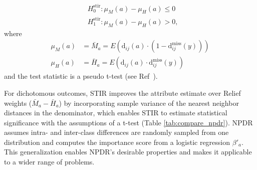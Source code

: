 \documentclass[10pt]{article}
\begin{document}

\begin{equation}
\begin{aligned}
    & H^{\text{stir}}_0: \mu_M(a) - \mu_H(a) \le 0 \\
    & H^{\text{stir}}_1: \mu_M(a) - \mu_H(a) > 0,
\end{aligned}
\end{equation}  
where
\begin{equation}
\begin{aligned}
    \mu_M(a) & = \bar{M}_a = E \left( \text{d}_{ij}(a) \cdot \left( 1-\text{d}^{\text{miss}}_{ij}(y) \right) \right) \\
    \mu_H(a) & = \bar{H}_a = E \left( \text{d}_{ij}(a) \cdot        \text{d}^{\text{miss}}_{ij}(y)           \right)
\end{aligned}
\end{equation}  
and the test statistic is a pseudo t-test (see Ref~\cite{stir}).

For dichotomous outcomes, STIR improves the attribute estimate over Relief weights ($\bar{M}_a - \bar{H}_a$) by incorporating sample variance of the nearest neighbor distances in the denominator, which enables STIR to estimate statistical significance with the assumptions of a t-test (Table \ref{tab:compare_npdr}).
NPDR assumes intra- and inter-class differences are randomly sampled from one distribution and computes the importance score from a logistic regression $\beta'_a$.
This generalization enables NPDR's desirable properties and makes it applicable to a wider range of problems.
\end{document}
